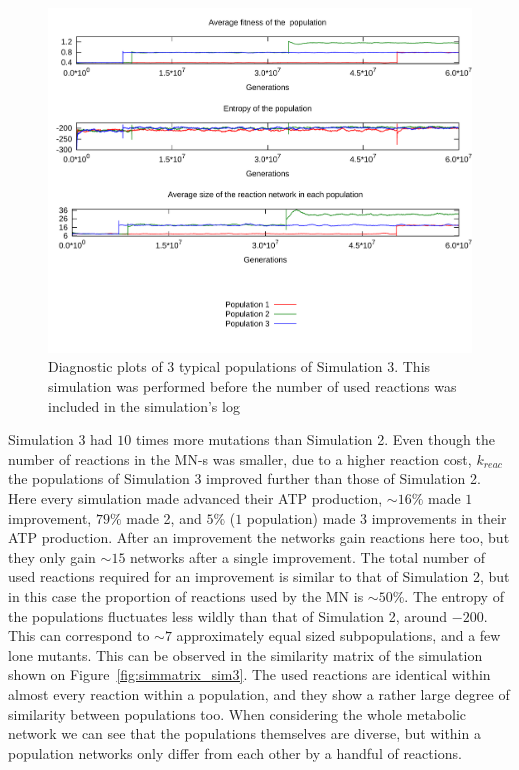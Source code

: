 \documentclass[a4paper,12pt]{article}
\begin{document}
\begin{figure}[htpb]
	\centering
	\includegraphics[width=0.8\linewidth]{simulation3.pdf}
	\caption{Diagnostic plots of 3 typical populations of Simulation 3. This simulation was performed before the number of used reactions was included in the simulation's log}
	\label{fig:simulation3}
\end{figure}

Simulation 3 had $10$ times more mutations than Simulation 2. Even though the number of reactions in the MN-s was smaller, due to a higher reaction cost, $k_{reac}$ the populations of Simulation 3 improved further than those of Simulation 2. Here every simulation made advanced their ATP production, $\sim 16\%$ made $1$ improvement, $79\%$ made 2, and $5\%$ ($1$ population) made $3$ improvements in their ATP production. After an improvement the networks gain reactions here too, but they only gain $\sim 15$ networks after a single improvement. The total number of used reactions required for an improvement is similar to that of Simulation 2, but in this case the proportion of reactions used by the MN is $\sim 50\%$. The entropy of the populations fluctuates less wildly than that of Simulation 2, around $-200$. This can correspond to $\sim 7$ approximately equal sized subpopulations, and a few lone mutants. This can be observed in the similarity matrix of the simulation shown on Figure~\ref{fig:simmatrix_sim3}. The used reactions are identical within almost every reaction within a population, and they show a rather large degree of similarity between populations too. When considering the whole metabolic network we can see that the populations themselves are diverse, but within a population networks only differ from each other by a handful of reactions. 
\end{document}
